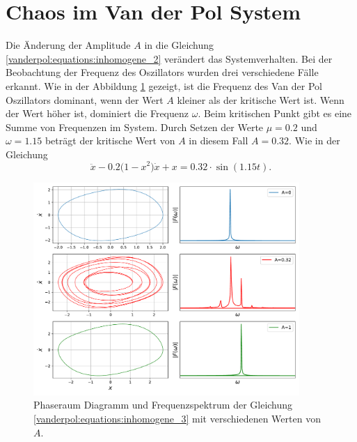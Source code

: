 \section{Chaos im Van der Pol System\label{vanderpol:section:chaos}}

Die Änderung der Amplitude $A$ in die Gleichung \eqref{vanderpol:equations:inhomogene_2} verändert das Systemverhalten. Bei der Beobachtung der Frequenz des Oszillators wurden drei verschiedene Fälle erkannt. Wie in der Abbildung \ref{vanderpol:figures:fft} gezeigt, ist die Frequenz des Van der Pol Oszillators dominant, wenn der Wert $A$ kleiner als der kritische Wert ist. Wenn der Wert höher ist, dominiert die Frequenz $\omega$. Beim kritischen Punkt gibt es eine Summe von Frequenzen im System. Durch Setzen der Werte $\mu=0.2$ und $\omega=1.15$ beträgt der kritische Wert von $A$ in diesem Fall $A=0.32$. Wie in der Gleichung
\begin{equation}
	\ddot{x}-0.2\bigl(1-x^{2}\bigr) \dot{x}+x = 0.32 \cdot \sin(1.15 t).
	\label{vanderpol:equations:inhomogene_3}
\end{equation}

\begin{figure}
	\centering
	\includegraphics[width=0.9\textwidth]{papers/vanderpol/figures/fft_plot2.pdf}
	\caption{Phaseraum Diagramm und Frequenzspektrum der Gleichung \eqref{vanderpol:equations:inhomogene_3} mit verschiedenen Werten von $A$.\label{vanderpol:figures:fft}}
\end{figure}

